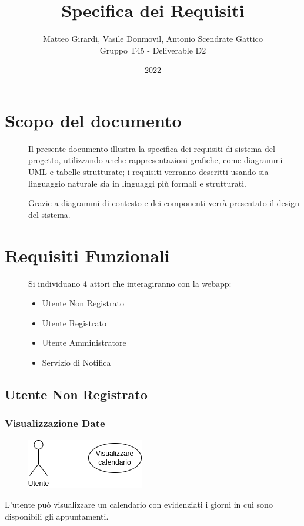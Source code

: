 \documentclass{article}
\title{\textbf{\Huge Specifica dei Requisiti}}
\author{Matteo Girardi, Vasile Donmovil, Antonio Scendrate Gattico \\ Gruppo T45 - Deliverable D2}
\date{2022}
\begin{document}
\maketitle

\clearpage
\tableofcontents
\clearpage

\section{Scopo del documento}
\begin{description}
    \item[] Il presente documento illustra la specifica dei requisiti di sistema del progetto, utilizzando anche rappresentazioni grafiche, come diagrammi UML e tabelle strutturate; i requisiti verranno descritti usando sia linguaggio naturale sia in linguaggi più formali e strutturati.
    \item[] Grazie a diagrammi di contesto e dei componenti verrà presentato il design del sistema.
\end{description}
\clearpage

\section{Requisiti Funzionali}
\begin{description}
	\item[] Si individuano 4 attori che interagiranno con la webapp:
		\begin{itemize}
		\item  Utente Non Registrato
		\item  Utente Registrato
		\item  Utente Amministratore
		\item  Servizio di Notifica
		\end{itemize}
\end{description}


\subsection{Utente Non Registrato}
\renewcommand\thesubsubsection{RF \arabic{subsubsection}}

\subsubsection{Visualizzazione Date}\label{rf_1}
\begin{description}
    
    \begin{figure}[htp]
	\centering
	\includegraphics[]{rf1.png}
	\end{figure}
     
    \item L'utente può visualizzare un calendario con evidenziati i giorni in cui sono disponibili gli appuntamenti. 
\end{description}
\end{document}
